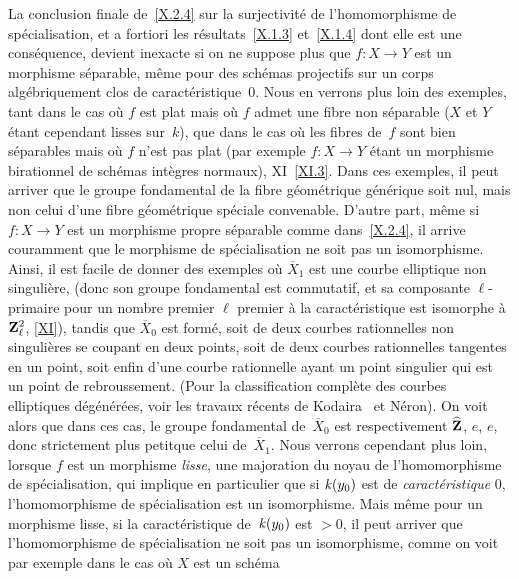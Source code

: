 \begin{remarques}
\label{X.2.5}
La conclusion finale de~\ref{X.2.4} sur la surjectivit\'e de
l'homomorphisme de sp\'e\-cia\-li\-sa\-tion, et a fortiori les
r\'esultats~\ref{X.1.3} et~\ref{X.1.4} dont elle est une
cons\'equence, devient inexacte si on ne suppose plus que $f\colon
X\to Y$ est un morphisme s\'eparable, m\^eme pour des sch\'emas
projectifs sur un corps alg\'ebriquement clos de
caract\'eristique~$0$. Nous en verrons plus loin des exemples, tant
dans le cas o\`u $f$ est plat mais o\`u $f$ admet une fibre non
s\'eparable ($X$ et $Y$ \'etant cependant lisses sur~$k$), que
dans le cas o\`u les fibres de~$f$ sont bien s\'eparables mais
o\`u $f$ n'est pas plat (par exemple $f\colon X\to Y$ \'etant un
morphisme birationnel de sch\'emas int\`egres normaux),
\cf XI~\ref{XI.3}. Dans ces exemples, il peut arriver que le groupe
fondamental de la fibre g\'eom\'etrique g\'en\'erique soit
nul, mais non celui d'une fibre g\'eom\'etrique sp\'eciale
convenable. D'autre part, m\^eme si $f\colon X\to Y$ est un
morphisme propre s\'eparable comme dans~\ref{X.2.4}, il arrive
couramment que le morphisme de sp\'ecialisation ne soit
pas un isomorphisme. Ainsi, il est facile de donner des exemples
o\`u $\overline X_1$ est une courbe elliptique non singuli\`ere,
(donc son groupe fondamental est commutatif, et sa composante
$\ell$-primaire pour un nombre premier $\ell$ premier \`a la
caract\'eristique est isomorphe \`a $\mathbf{Z}_\ell^2$, \cf \ref{XI}),
tandis que $\overline X_0$ est form\'e, soit de deux courbes
rationnelles non singuli\`eres se coupant en deux points, soit de
deux courbes rationnelles tangentes en un point, soit enfin d'une
courbe rationnelle ayant un point singulier qui est un point de
rebroussement. (Pour la classification compl\`ete des courbes
elliptiques d\'eg\'en\'er\'ees, voir les travaux r\'ecents
de Kodaira~\cite{X.1} et N\'eron). On voit alors que dans ces cas, le
groupe fondamental de~$\overline X_0$ est respectivement $\widehat{\mathbf{Z}}$,
$e$, $e$, donc \og strictement plus petit\fg que celui de~$\overline
X_1$. Nous verrons cependant plus loin, lorsque $f$ est un morphisme
\emph{lisse}, une majoration du noyau de l'homomorphisme de
sp\'ecialisation, qui implique en particulier que si $\mathit{k}(y_0)$ est
de \emph{caractéristique} 0, l'homomorphisme de sp\'ecialisation
est un isomorphisme. Mais m\^eme pour un morphisme lisse, si la
caract\'eristique de~$\mathit{k}(y_0)$ est $>0$, il peut arriver que
l'homomorphisme de sp\'ecialisation ne soit pas un isomorphisme,
comme on voit par exemple dans le cas o\`u $X$ est un sch\'ema

\end{remarques}
